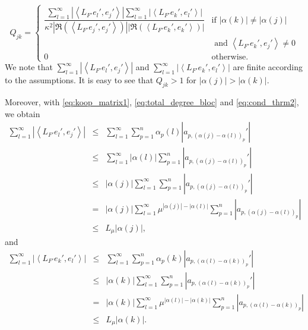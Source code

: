 \documentclass{article}
\begin{document}
{\small
\begin{equation}\label{eq:maxim2_analytic}
Q_{jk}= \begin{cases}
\dfrac{\sum_{l=1}^{\infty}\left| \left\langle  L_{F'}e_l',e_j'\right\rangle \right| \sum_{l=1}^{\infty}\left| \left\langle  L_{F'}e_k',e_l'\right\rangle \right|}{\kappa^2\left|\Re\left(\left\langle  L_{F'} e_j', e_j' \right\rangle\right)\right|\left|\Re\left(\left\langle   L_{F'} e_k',  e_k' \right\rangle\right)\right|} & \textrm{if } |\alpha(k)|\neq |\alpha(j)| \\ 
&  \textrm{ and }\left\langle L_{F'} e_k',  e_j' \right\rangle\neq 0 \\
0 & \textrm{otherwise.}
\end{cases}
\end{equation}}
We note that $\sum_{l=1}^{\infty}\left| \left\langle L_{F'}e_l', e_j' \right\rangle \right| $ and $ \sum_{l=1}^{\infty}\left| \left\langle  L_{F'}e_k',e_l'\right\rangle \right|$ are finite according to the assumptions. It is easy to see that $Q_{jk}>1$ for $|\alpha(j)| > |\alpha(k)|$. 

Moreover, with \eqref{eq:koop_matrix1},  \eqref{eq:total_degree_bloc} and \eqref{eq:cond_thrm2}, we obtain
{\small
\begin{eqnarray*}
\sum_{l=1}^\infty \left| \left\langle  L_{F'}e_l',e_j'\right\rangle \right| & \leq & \sum_{l=1}^\infty
\sum_{p=1}^n \alpha_p(l)  \left| a_{p,(\alpha(j)-\alpha(l))_p}'\right|\\
 & \leq & 
\sum_{l=1}^\infty \left| \alpha(l)\right|  \sum_{p=1}^n   \left| a_{p,(\alpha(j)-\alpha(l))_p}'\right|\\
& \leq & \left| \alpha(j)\right|  
\sum_{l=1}^\infty  \sum_{p=1}^n   \left| a_{p,(\alpha(j)-\alpha(l))_p}'\right|\\
& = & \left| \alpha(j)\right|  
\sum_{l=1}^\infty \mu^{|\alpha(j)|-|\alpha(l)|} \sum_{p=1}^n   \left| a_{p,(\alpha(j)-\alpha(l))_p}\right|\\
 & \leq & L_\mu
\left| \alpha(j)\right|,
\end{eqnarray*}}
and
{\small\begin{eqnarray*}
\sum_{l=1}^\infty \left| \left\langle  L_{F'}e_k',e_l'\right\rangle \right| & \leq & \sum_{l=1}^\infty
\sum_{p=1}^n \alpha_p(k)  \left| a_{p,(\alpha(l)-\alpha(k))_p}'\right|\\
& \leq & \left| \alpha(k)\right|  
\sum_{l=1}^\infty  \sum_{p=1}^n   \left| a_{p,(\alpha(l)-\alpha(k))_p}'\right|\\
  & = & \left| \alpha(k)\right|  
  \sum_{l=1}^\infty \mu^{|\alpha(l)|-|\alpha(k)|}  \sum_{p=1}^n \left| a_{p,(\alpha(l)-\alpha(k))_p}\right|\\
 & \leq & L_\mu
\left| \alpha(k)\right|.
\end{eqnarray*}}
\end{document}
